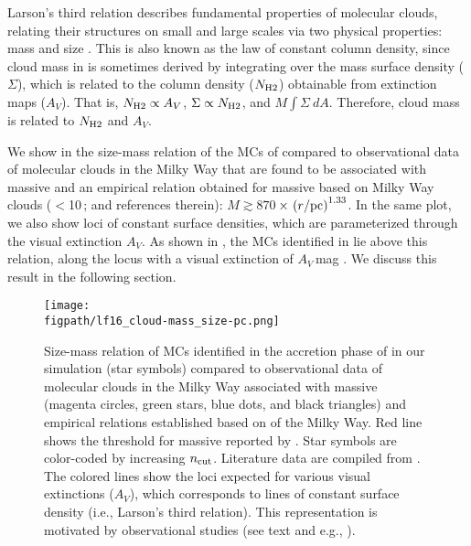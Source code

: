 \IfFileExists{emulateapjlegacy.cls}{\documentclass[iop]{emulateapjlegacy}}{\documentclass[iop]{emulateapj}}
\def\figpath{./Fig}
\begin{document}
Larson's third relation describes fundamental properties of molecular clouds, relating their structures on small and large scales
via two physical properties: mass and size \citep{Larson81a, McKee07a}. This is also known as the law of constant column density,
since cloud mass in \obs is sometimes derived by integrating
over the mass surface density ($\Sigma$), which is related to the column density ($N_{\rm H2}$) obtainable from extinction maps ($A_V$).
That is, $N_{\rm H2}\propto A_V$, $\Sigma\propto N_{\rm H2}$, and $M$\eq$\int \Sigma~dA$.
Therefore, cloud mass is related to $N_{\rm H2}$ and $A_V$.

We show in  the size-mass relation of the MCs of \flower %
compared to
observational data of molecular clouds in the Milky Way that are found to be associated with massive \SF
\citep{Beuther02a, Mueller02a, Hill05a, Motte07a} and an empirical relation obtained for massive \SF based on
Milky Way clouds ($<$10\,\Msun; \citealt{Kauffmann10b, Kauffmann10c} and references therein): $M \gtrsim 870$\,\Msun$\times\,\left(r/{\rm pc}\right)^{1.33}$.
In the same plot, we also show loci of constant surface densities, which are parameterized through the visual extinction $A_V$.
As shown in , the MCs identified 
in \flower lie above this relation, along the locus
with a visual extinction of $A_V$\,mag \citep{Lombardi10a}.
We discuss this result in the following section.

\begin{figure*}[htbp]
\centering
\texttt{[image: \\figpath/lf16\_cloud-mass\_size-pc.png]}
\caption{
Size-mass relation of MCs identified in the accretion phase of \flower in our simulation (star symbols)
compared to observational data of molecular clouds in the Milky Way associated with massive \SF
(magenta circles, green stars, blue dots, and black triangles) and empirical relations
established based on \obs of the Milky Way.
Red line shows the threshold for massive \SF reported by \citet{Kauffmann10b}.
Star symbols are color-coded by increasing $n_{\rm cut}$.
Literature data are compiled from \citet{Beuther02a, Mueller02a, Hill05a, Motte07a}.
The colored lines show the loci expected for various visual extinctions ($A_V$), which corresponds to
lines of constant surface density (i.e., Larson's third relation). This representation is motivated by observational studies (see text and e.g., \citealt{Lombardi10a}).
\label{fig:MR}}
\end{figure*}
\end{document}
